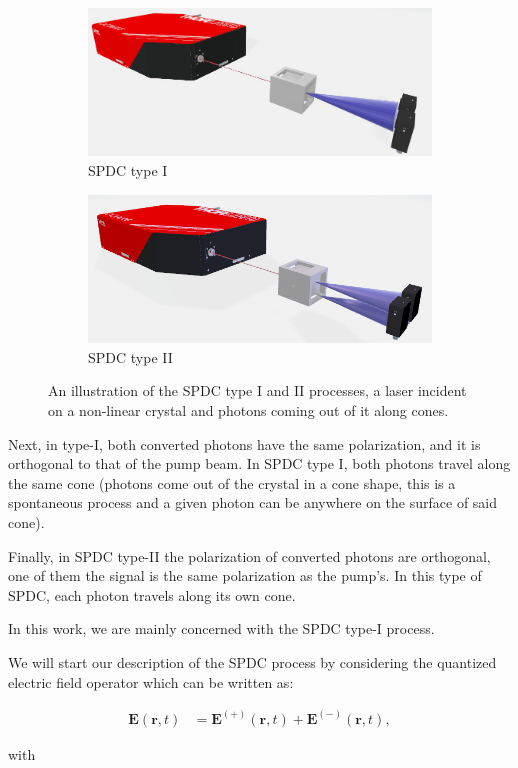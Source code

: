 \documentclass[12pt]{book}
\begin{document}
\begin{figure}[h!]
\centering
\begin{subfigure}[b]{0.45\linewidth}
\includegraphics[width=\linewidth,height=2.8 cm]{images/TypeI.jpg}
\caption{SPDC type I}
\label{fig:type1}
\end{subfigure}
\begin{subfigure}[b]{0.45\linewidth}
\includegraphics[width=\linewidth,height=2.8 cm]{images/typeII.jpg}
\caption{SPDC type II}
\label{fig:type2}
\end{subfigure}
\caption{An illustration of the SPDC type I and II processes, a laser incident on a non-linear crystal and photons coming out of it along cones.}
\label{fig:SPDC}
\end{figure}

Next, in type-I, both converted photons have the same polarization, and it is orthogonal to that of the pump beam. In SPDC type I, both photons travel along the same cone (photons come out of the crystal in a cone shape, this is a spontaneous process and a given photon can be anywhere on the surface of said cone).

Finally, in SPDC type-II the polarization of converted photons are orthogonal, one of them the signal is the same polarization as the pump's. In this type of SPDC, each photon travels along its own cone.

In this work, we are mainly concerned with the SPDC type-I process.

We will start our description of the SPDC process by considering the quantized electric field operator which can be written as:

\begin{align}
\textbf{E}(\textbf{r},t)&=\textbf{E}^{(+)} (\textbf{r},t) + \textbf{E}^{(-)} (\textbf{r},t), \label{fiel+}
\end{align}

with
\end{document}
